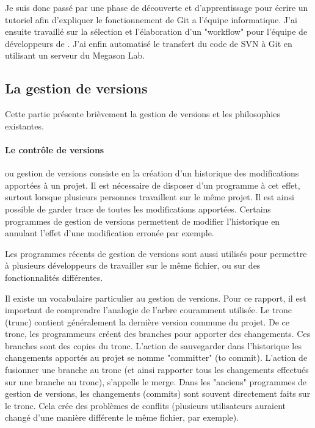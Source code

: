 Je suis donc passé par une phase de découverte et d'apprentissage pour écrire un tutoriel 
afin d'expliquer le fonctionnement de Git a l'équipe informatique. J'ai ensuite travaillé sur la sélection et l'élaboration d'un "workflow"
pour l'équipe de développeurs de {\gofigure}.
J'ai enfin automatisé le transfert du code de SVN à Git en utilisant un serveur du Megason Lab.



\subsection{La gestion de versions}

Cette partie présente brièvement la gestion de versions et les philosophies existantes.

\paragraph{Le contrôle de versions} ou gestion de versions consiste en
la création d'un historique des modifications apportées à un projet.
Il est nécessaire de disposer d'un programme à cet effet,
surtout lorsque plusieurs personnes travaillent sur le même projet.
Il est ainsi possible de garder trace de toutes les modifications apportées.
Certains programmes de gestion de versions permettent
de modifier l'historique en annulant l'effet d'une modification erronée par exemple.

Les programmes récents de gestion de versions sont aussi utilisés
pour permettre à plusieurs développeurs de travailler 
sur le même fichier, ou sur des fonctionnalités différentes.

Il existe un vocabulaire particulier au gestion de versions.
Pour ce rapport, il est important de comprendre l'analogie de l'arbre couramment utilisée.
Le tronc (trunc) contient généralement la dernière version commune du projet.
De ce tronc, les programmeurs créent des branches pour apporter des changements.
Ces branches sont des copies du tronc.
L'action de sauvegarder dans l'historique les changements apportés au projet se nomme "committer" (to commit).
L'action de fusionner une branche au tronc
(et ainsi rapporter tous les changements effectués sur une branche au tronc), s'appelle le merge.
Dans les  "anciens" programmes de gestion de versions,
les changements (commits) sont souvent directement faits sur le tronc.
Cela crée des problèmes de conflits
(plusieurs utilisateurs auraient changé d'une manière différente le même fichier, par exemple).

